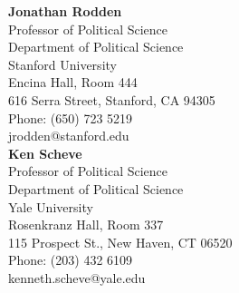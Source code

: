 \documentclass[11pt]{article}
\begin{document}
\begin{minipage}[t]{.37\textwidth}
	\textbf{Jonathan Rodden} \\
	Professor of Political Science \\
	Department of Political Science \\
	Stanford University \\
	Encina Hall, Room 444\\
	616 Serra Street, Stanford, CA 94305\\
	Phone: (650) 723 5219 \\
	jrodden@stanford.edu \\

	\vspace{.2in}
	\textbf{Ken Scheve} \\
	Professor of Political Science \\
	Department of Political Science \\
	Yale University \\
	Rosenkranz Hall, Room 337\\
	115 Prospect St., New Haven, CT 06520\\
	Phone: (203) 432 6109 \\
	kenneth.scheve@yale.edu \\
\end{minipage}



\vspace{.2in}
\begin{minipage}[t]{.21\textwidth}
	 \\
\end{minipage}
\end{document}
